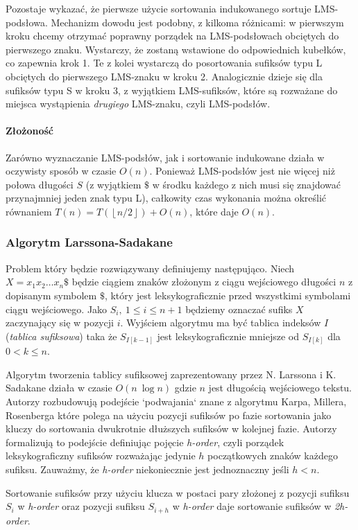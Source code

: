 Pozostaje wykazać, że pierwsze użycie sortowania indukowanego sortuje
LMS-podsłowa. Mechanizm dowodu jest podobny, z kilkoma różnicami: w pierwszym
kroku chcemy otrzymać poprawny porządek na LMS-podsłowach obciętych do
pierwszego znaku. Wystarczy, że zostaną wstawione do odpowiednich kubełków,
co zapewnia krok 1. Te z kolei wystarczą do posortowania sufiksów typu L
obciętych do pierwszego LMS-znaku w kroku 2. Analogicznie dzieje się dla
sufiksów typu S w kroku 3, z wyjątkiem LMS-sufiksów, które są rozważane
do miejsca wystąpienia \textit{drugiego} LMS-znaku, czyli LMS-podsłów.

\paragraph{Złożoność}

Zarówno wyznaczanie LMS-podsłów, jak i sortowanie indukowane działa w oczywisty
sposób w czasie $O(n)$. Ponieważ LMS-podsłów jest nie więcej niż połowa
długości $S$ (z wyjątkiem \(\$\) w środku każdego z nich musi się znajdować
przynajmniej jeden znak typu L), całkowity czas wykonania można określić
równaniem $T(n) = T(\left \lfloor{n/2}\right \rfloor) + O(n)$, które daje
$O(n)$.

\subsubsection{Algorytm Larssona-Sadakane}

Problem który będzie rozwiązywany definiujemy następująco. Niech $X = x_1 x_2 \ldots x_n \$ $ będzie ciągiem znaków złożonym z ciągu wejściowego długości $n$ z dopisanym symbolem $\$$, który jest leksykograficznie przed wszystkimi symbolami ciągu wejściowego. Jako $S_i,\ 1 \leq i \leq n+1$ będziemy oznaczać sufiks $X$ zaczynający się w pozycji $i$. Wyjściem algorytmu ma być tablica indeksów $I$ (\textit{tablica sufiksowa}) taka że $S_{I[k-1]}$ jest leksykograficznie mniejsze od $S_{I[k]}$ dla $0 < k \leq n$.

Algorytm tworzenia tablicy sufiksowej zaprezentowany przez N. Larssona i K. Sadakane działa w czasie $O(n\ \log{n})$ gdzie $n$ jest długością wejściowego tekstu. Autorzy rozbudowują podejście  `podwajania` znane z algorytmu Karpa, Millera, Rosenberga które polega na użyciu pozycji sufiksów po fazie sortowania jako kluczy do sortowania dwukrotnie dłuższych sufiksów w kolejnej fazie. Autorzy formalizują to podejście definiując pojęcie \textit{h-order}, czyli porządek leksykograficzny sufiksów rozważając jedynie $h$ początkowych znaków każdego sufiksu. Zauważmy, że \textit{h-order} niekoniecznie jest jednoznaczny jeśli $h < n$.
\begin{lemma}{}{}
\label{obs1}
Sortowanie sufiksów przy użyciu klucza w postaci pary złożonej z pozycji sufiksu $S_i$ w \textit{h-order} oraz pozycji sufiksu $S_{i+h}$ w \textit{h-order} daje sortowanie sufiksów w \textit{2h-order}.
\end{lemma}

